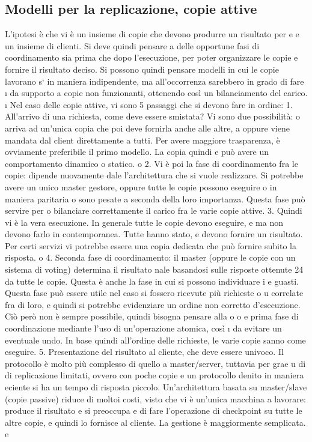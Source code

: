 \documentclass[a4paper,12pt]{article}
\begin{document}
\subsection{Modelli per la replicazione, copie attive}
L'ipotesi è che vi è un insieme di copie che devono produrre un risultato per
e
e
un insieme di clienti. Si deve quindi pensare a delle opportune fasi di coordinamento sia prima che dopo l'esecuzione,
per poter organizzare le copie e
fornire il risultato deciso. Si possono quindi pensare modelli in cui le copie lavorano s` in maniera indipendente, ma
all'occorrenza sarebbero in grado di fare
\i{}
da supporto a copie non funzionanti, ottenendo così un bilanciamento del carico.
\i{}
Nel caso delle copie attive, vi sono 5 passaggi che si devono fare in ordine:
1. All'arrivo di una richiesta, come deve essere smistata? Vi sono due possibilità: o arriva ad un'unica copia che poi
deve fornirla anche alle altre,
a
oppure viene mandata dal client direttamente a tutti. Per avere maggiore
trasparenza, è ovviamente preferibile il primo modello. La copia quindi
e
può avere un comportamento dinamico o statico.
o
2. Vi è poi la fase di coordinamento fra le copie: dipende nuovamente dale
l'architettura che si vuole realizzare. Si potrebbe avere un unico master
gestore, oppure tutte le copie possono eseguire o in maniera paritaria o
sono pesate a seconda della loro importanza. Questa fase può servire per
o
bilanciare correttamente il carico fra le varie copie attive.
3. Quindi vi è la vera esecuzione. In generale tutte le copie devono eseguire,
e
ma non devono farlo in contemporanea. Tutte hanno stato, e devono
fornire un risultato. Per certi servizi vi potrebbe essere una copia dedicata
che può fornire subito la risposta.
o
4. Seconda fase di coordinamento: il master (oppure le copie con un sistema
di voting) determina il risultato nale basandosi sulle risposte ottenute
24
da tutte le copie. Questa è anche la fase in cui si possono individuare i
e
guasti. Questa fase può essere utile nel caso si fossero ricevute più richieste
o
u
correlate fra di loro, e quindi si potrebbe evidenziare un ordine non corretto
d'esecuzione. Ciò però non è sempre possibile, quindi bisogna pensare alla
o
o
e
prima fase di coordinazione mediante l'uso di un'operazione atomica, così
\i{}
da evitare un eventuale undo. In base quindi all'ordine delle richieste, le
varie copie sanno come eseguire.
5. Presentazione del risultato al cliente, che deve essere univoco.
Il protocollo è molto più complesso di quello a master/server, tuttavia per grae
u
di di replicazione limitati, ovvero con poche copie e un protocollo denito in
maniera eciente si ha un tempo di risposta piccolo.
Un'architettura basata su master/slave (copie passive) riduce di moltoi costi,
visto che vi è un'unica macchina a lavorare: produce il risultato e si preoccupa
e
di fare l'operazione di checkpoint su tutte le altre copie, e quindi lo fornisce al
cliente. La gestione è maggiormente semplicata.
e
\end{document}
